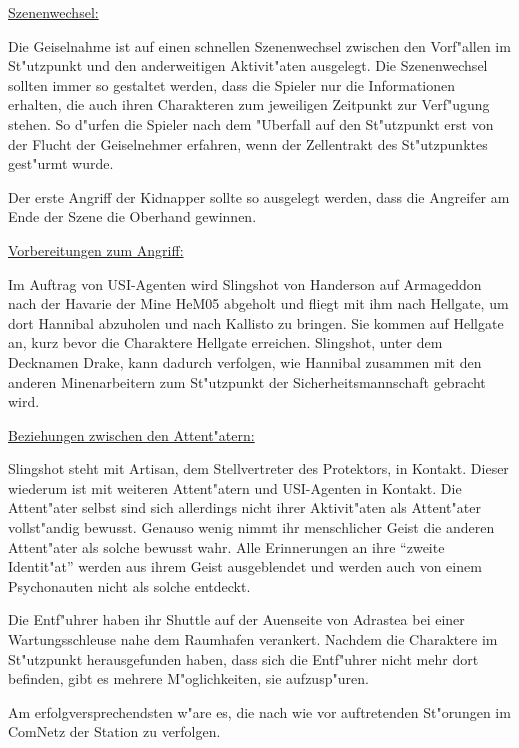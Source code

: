 \begin{remarks}
	\underline{Szenenwechsel:}

	Die Geiselnahme ist auf einen schnellen Szenenwechsel zwischen den Vorf"allen im St"utzpunkt und den anderweitigen Aktivit"aten ausgelegt. Die Szenenwechsel sollten immer so gestaltet werden, dass die Spieler nur die Informationen erhalten, die auch ihren Charakteren zum jeweiligen Zeitpunkt zur Verf"ugung stehen. So d"urfen die Spieler nach dem "Uberfall auf den St"utzpunkt erst von der Flucht der Geiselnehmer erfahren, wenn der Zellentrakt des St"utzpunktes gest"urmt wurde.

	Der erste Angriff der Kidnapper sollte so ausgelegt werden, dass die Angreifer am Ende der Szene die Oberhand gewinnen.

	\underline{Vorbereitungen zum Angriff:}
	
	Im Auftrag von USI-Agenten wird Slingshot von Handerson auf Armageddon nach der Havarie der Mine HeM05 abgeholt und fliegt mit ihm nach Hellgate, um dort Hannibal abzuholen und nach Kallisto zu bringen. Sie kommen auf Hellgate an, kurz bevor die Charaktere Hellgate erreichen. Slingshot, unter dem Decknamen Drake, kann dadurch verfolgen, wie Hannibal zusammen mit den anderen Minenarbeitern zum St"utzpunkt der Sicherheitsmannschaft gebracht wird.

	\underline{Beziehungen zwischen den Attent"atern:}

	Slingshot steht mit Artisan, dem Stellvertreter des Protektors, in Kontakt. Dieser wiederum ist mit weiteren Attent"atern und 
	USI-Agenten in Kontakt. Die Attent"ater selbst sind sich allerdings nicht ihrer Aktivit"aten als Attent"ater vollst"andig bewusst. Genauso wenig nimmt ihr menschlicher Geist die anderen Attent"ater als solche bewusst wahr. Alle Erinnerungen an ihre ``zweite Identit"at'' werden aus ihrem Geist ausgeblendet und werden auch von einem Psychonauten nicht als solche entdeckt.
\end{remarks}



Die Entf"uhrer haben ihr Shuttle auf der Au\3enseite von Adrastea bei einer Wartungsschleuse nahe dem Raumhafen verankert. Nachdem die Charaktere im St"utzpunkt herausgefunden haben, dass sich die Entf"uhrer nicht mehr dort befinden, gibt es mehrere M"oglichkeiten, sie aufzusp"uren.

Am erfolgversprechendsten w"are es, die nach wie vor auftretenden St"orungen im ComNetz der Station zu verfolgen.

